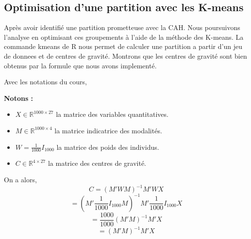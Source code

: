 \documentclass{article}
\begin{document}
\subsection{Optimisation d'une partition avec les K-means}
Après avoir identifié une partition prometteuse avec la CAH. Nous poursuivons l'analyse en optimisant ces groupements à l'aide de la méthode des K-means. 
La commande kmeans de R nous permet de calculer une partition a partir d'un jeu de 
donnees et de centres de gravité. Montrons que les centres de gravité sont bien obtenus par la formule que nous avons implementé.

Avec les notations du cours,
\par\textbf{Notons :}
\begin{itemize}
    \item $X \in \mathbb{R}^{1000\times 27}$ la matrice des variables quantitatives.
    \item $M \in \mathbb{R}^{1000\times 4}$ la matrice indicatrice des modalités.
    \item $W = \frac{1}{1000} I_{1000}$ la matrice des poids des individus.
    \item $C \in \mathbb{R}^{4\times 27}$ la matrice des centres de gravité.
\end{itemize}

On a alors, 
\[
C = (M'WM)^{-1}M'WX
\]
\[
=(M'\frac{1}{1000} I_{1000} M)^{-1}M' \frac{1}{1000} I_{1000} X
\]
\[
=\frac{1000}{1000}(M'M)^{-1} M'X
\]
\[
= (M'M)^{-1} M'X
\]
\end{document}
